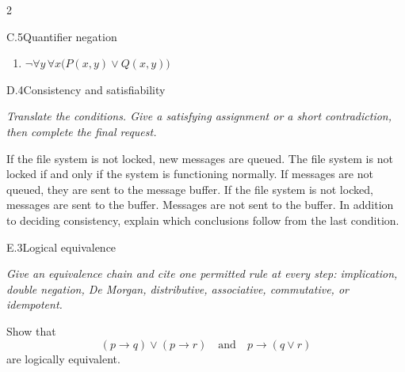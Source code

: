 \documentclass[9pt]{extarticle}
\begin{document}
\begin{multicols}{2}
\begin{CoreProblem}{C.5}{Quantifier negation}
\begin{enumerate}[label=(\alph*)]
  \item $\neg\forall y\,\forall x\bigl(P(x,y)\lor Q(x,y)\bigr)$
\end{enumerate}
\end{CoreProblem}
\columnbreak
\begin{CoreProblem}{D.4}{Consistency and satisfiability}
{\scriptsize\textit{Translate the conditions. Give a satisfying assignment or a short contradiction, then complete the final request.}\par}
If the file system is not locked, new messages are queued. The file system is
not locked if and only if the system is functioning normally. If messages are
not queued, they are sent to the message buffer. If the file system is not
locked, messages are sent to the buffer. Messages are not sent to the buffer.
In addition to deciding consistency, explain which conclusions follow from the
last condition.
\end{CoreProblem}
\begin{CoreProblem}{E.3}{Logical equivalence}
{\scriptsize\textit{Give an equivalence chain and cite one permitted rule at every step: implication, double negation, De Morgan, distributive, associative, commutative, or idempotent.}\par}
Show that
\[
  (p\to q)\lor(p\to r)
  \quad\text{and}\quad
  p\to(q\lor r)
\]
are logically equivalent.
\end{CoreProblem}
\end{multicols}
\CoreWorkArea
\FormBreak
{}
\end{document}

